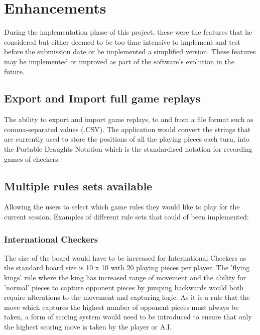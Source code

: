 \documentclass[10pt, a4paper]{article}
\begin{document}
 
 
 
 \section{Enhancements}
 During the implementation phase of this project, these were the features that he considered but either deemed to be too time intensive to implement and test before the submission date or he implemented a simplified version. These features may be implemented or improved as part of the software's evolution in the future.
 
 
 \subsection{Export and Import full game replays}
 The ability to export and import game replays, to and from a file format such as comma-separated values (.CSV).     
 The application would convert the strings that are currently used to store the positions of all the playing pieces each turn, into the Portable Draughts Notation which is the standardised notation for recording games of checkers. 
 
 
 \subsection{Multiple rules sets available}
 Allowing the users to select which game rules they would like to play for the current session. Examples of different rule sets that could of been implemented:
 
 
 \subsubsection{International Checkers}
 The size of the board would have to be increased for International Checkers as the standard board size is 10 x 10 with 20 playing pieces per player. The 'flying kings' rule where the king has increased range of movement and the ability for 'normal' pieces to capture opponent pieces by jumping backwards would both require alterations to the movement and capturing logic.    
 As it is a rule that the move which captures the highest number of opponent pieces must always be taken, a form of scoring system would need to be introduced to ensure that only the highest scoring move is taken by the player or A.I.
 
\end{document}
